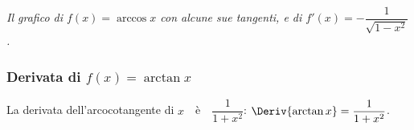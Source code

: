 \begin{inaccessibleblock}
\hspace{-20mm}
\end{inaccessibleblock}
\label{img:diff_parabola_con_pendenze}
\begin{center} 
\emph{Il grafico di \(f(x)=\arccos x\) con alcune sue tangenti, e di 
\(f'(x)=-\dfrac{1}{\sqrt{1-x^2}}\).}
\end{center}

\subsubsection{Derivata di \(f(x)=\arctan x\)}

\begin{teorema}
La derivata dell'arcocotangente di \(x\)~~è~~\(\dfrac{1}{1+x^2}\): 
\quad 
\(\Deriv{\arctan x} = \dfrac{1}{1+x^2}\).
\end{teorema}

